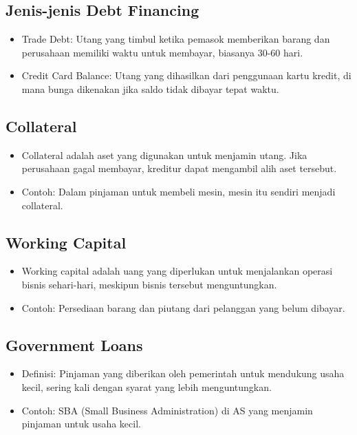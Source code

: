 \documentclass{article}
\begin{document}
\subsection{Jenis-jenis Debt Financing}
\begin{itemize}
    \item Trade Debt: Utang yang timbul ketika pemasok memberikan barang dan perusahaan memiliki waktu untuk membayar, biasanya 30-60 hari.
    \item Credit Card Balance: Utang yang dihasilkan dari penggunaan kartu kredit, di mana bunga dikenakan jika saldo tidak dibayar tepat waktu.
\end{itemize}

\subsection{Collateral}
\begin{itemize}
    \item Collateral adalah aset yang digunakan untuk menjamin utang. Jika perusahaan gagal membayar, kreditur dapat mengambil alih aset tersebut.
    \item Contoh: Dalam pinjaman untuk membeli mesin, mesin itu sendiri menjadi collateral.
\end{itemize}

\subsection{Working Capital}
\begin{itemize}
    \item Working capital adalah uang yang diperlukan untuk menjalankan operasi bisnis sehari-hari, meskipun bisnis tersebut menguntungkan.
    \item Contoh: Persediaan barang dan piutang dari pelanggan yang belum dibayar.
\end{itemize}

\subsection{Government Loans}
\begin{itemize}
    \item Definisi: Pinjaman yang diberikan oleh pemerintah untuk mendukung usaha kecil, sering kali dengan syarat yang lebih menguntungkan.
    \item Contoh: SBA (Small Business Administration) di AS yang menjamin pinjaman untuk usaha kecil.
\end{itemize}
\end{document}

